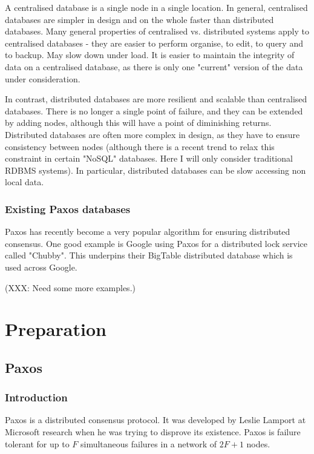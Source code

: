 \documentclass[12pt,twoside,notitlepage]{report}
\begin{document}
A centralised database is a single node in a single location.
In general, centralised databases are simpler in design and on the whole faster than distributed
databases.
Many general properties of centralised vs. distributed systems apply to centralised databases -
they are easier to perform organise, to edit, to query and to backup. May slow down under load. It
is easier to maintain the integrity of data on a centralised database, as there is only one
"current" version of the data under consideration.

In contrast, distributed databases are more resilient and scalable than centralised databases.
There is no longer a single point of failure, and they can be extended by adding nodes, although
this will have a point of diminishing returns. Distributed databases are often more complex in
design, as they have to ensure consistency between nodes (although there is a recent trend to
relax this constraint in certain "NoSQL" databases. Here I will only consider traditional RDBMS
systems). In particular, distributed databases can be slow accessing non local data.

\subsection*{Existing Paxos databases}

Paxos has recently become a very popular algorithm for ensuring distributed consensus. One good
example is Google using Paxos for a distributed lock service called "Chubby". This underpins their
BigTable distributed database which is used across Google.

(XXX: Need some more examples.)

\cleardoublepage

\chapter{Preparation}

\section{Paxos}

\subsection{Introduction}

Paxos is a distributed consensus protocol. It was developed by Leslie Lamport at Microsoft
research when he was trying to disprove its existence. Paxos is failure tolerant for up to $F$
simultaneous failures in a network of $2F + 1$ nodes.
\end{document}

